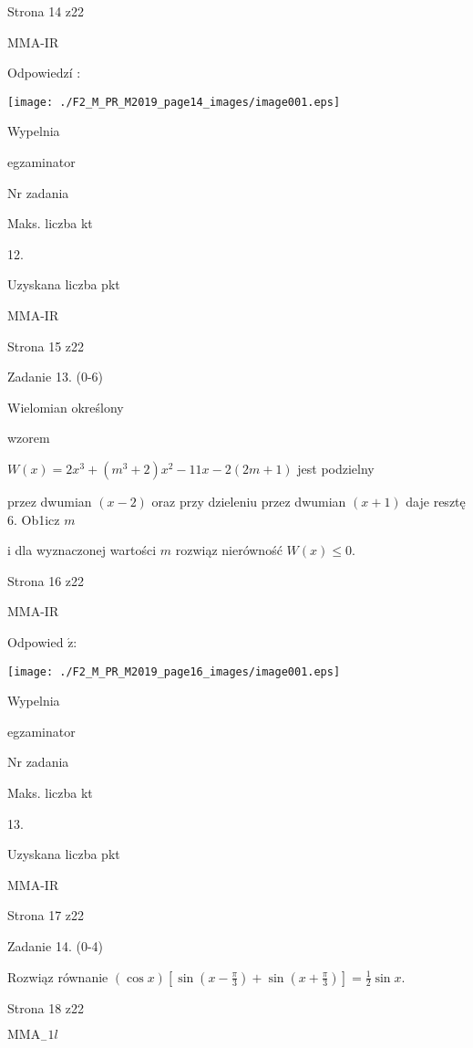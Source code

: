 \documentclass[a4paper,12pt]{article}
\begin{document}
Strona 14 z22

MMA-IR





Odpowiedzí :
\begin{center}
\texttt{[image: ./F2\_M\_PR\_M2019\_page14\_images/image001.eps]}
\end{center}
Wypelnia

egzaminator

Nr zadania

Maks. liczba kt

12.

Uzyskana liczba pkt

MMA-IR

Strona 15 z22





Zadanie 13. (0-6)

Wielomian określony

wzorem

$W(x)=2x^{3}+(m^{3}+2)x^{2}-11x-2(2m+1)$ jest podzielny

przez dwumian $(x-2)$ oraz przy dzieleniu przez dwumian $(x+1)$ daje resztę 6. Ob1icz $m$

i dla wyznaczonej wartości $m$ rozwiąz nierówność $W(x)\leq 0.$

Strona 16 z22

MMA-IR





Odpowied $\acute{\mathrm{z}}$:
\begin{center}
\texttt{[image: ./F2\_M\_PR\_M2019\_page16\_images/image001.eps]}
\end{center}
Wypelnia

egzaminator

Nr zadania

Maks. liczba kt

13.

Uzyskana liczba pkt

MMA-IR

Strona 17 z22





Zadanie 14. (0-4)

Rozwiąz równanie $(\displaystyle \cos x)[\sin(x-\frac{\pi}{3})+\sin(x+\frac{\pi}{3})]=\frac{1}{2}\sin x.$

Strona 18 z22

$\mathrm{M}\mathrm{M}\mathrm{A}_{-}1l$
\end{document}
